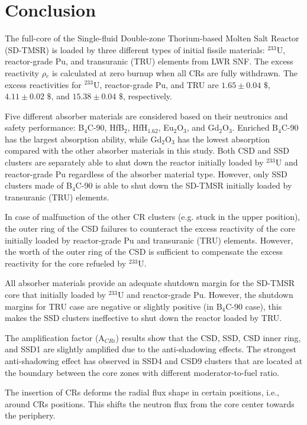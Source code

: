 \section{Conclusion} \label{Conclusion}
The full-core of the Single-fluid Double-zone Thorium-based Molten Salt Reactor (SD-TMSR) is loaded by three different types of initial fissile materials: $^{233}$U, reactor-grade Pu, and transuranic (TRU) elements from \gls{LWR} \gls{SNF}. The excess reactivity $\rho$$_e$ is calculated at zero burnup when all CRs are fully withdrawn. The excess reactivities for $^{233}$U, reactor-grade Pu, and TRU are $1.65\pm0.04$ $\$$, $4.11\pm0.02$ $\$$, and $15.38\pm0.04$ $\$$, respectively.

Five different absorber materials are considered based on their neutronics and safety performance: B$_4$C-90, HfB$_2$, HfH$_{1.62}$, Eu$_2$O$_3$, and Gd$_2$O$_3$. Enriched B$_4$C-90 has the largest absorption ability, while Gd$_2$O$_3$ has the lowest absorption compared with the other absorber materials in this study. Both CSD and SSD clusters are separately able to shut down the reactor initially loaded by $^{233}$U and reactor-grade Pu regardless of the absorber material type. However, only SSD clusters made of B$_4$C-90 is able to shut down the SD-TMSR initially loaded by transuranic (TRU) elements.

In case of malfunction of the other CR clusters (e.g. stuck in the upper position), the outer ring of the CSD failures to counteract the excess reactivity of the core initially loaded by reactor-grade Pu and transuranic (TRU) elements. However, the worth of the outer ring of the CSD is sufficient to compensate the excess reactivity for the core refueled by $^{233}$U.

All absorber materials provide an adequate shutdown margin for the SD-TMSR core that initially loaded by $^{233}$U and reactor-grade Pu. However, the shutdown margins for TRU case are negative or slightly positive (in B$_4$C-90 case), this makes the SSD clusters ineffective to shut down the reactor loaded by TRU.

The amplification factor (A$_{CRi}$) results show that the CSD, SSD, CSD inner ring, and SSD1 are slightly amplified due to the anti-shadowing effects. The strongest anti-shadowing effect has observed in SSD4 and CSD9 clusters that are located at the boundary between the core zones with different moderator-to-fuel ratio.

The insertion of CRs deforms the radial flux shape in certain positions, i.e., around CRs positions. This shifts the neutron flux from the core center towards the periphery.

